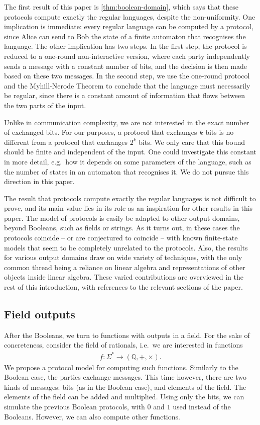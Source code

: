 The first result of this paper is \cref{thm:boolean-domain}, which says that these protocols compute exactly the regular languages, despite the non-uniformity. One implication is immediate: every regular language can be computed by a protocol, since Alice can send to Bob the state of a finite automaton that recognises the language. The other implication has two steps. In the first step, the protocol is reduced to a one-round non-interactive version, where each party independently sends a message with a constant number of bits, and the decision is then made based on these two messages. In the second step, we use the one-round protocol and the Myhill-Nerode Theorem to conclude that the language must necessarily be regular, since there is a constant amount of information that flows between the two parts of the input. 

Unlike in communication complexity, we are not interested in the exact number of exchanged bits. For our purposes, a protocol that exchanges $k$ bits is no different from a protocol that exchanges $2^k$ bits. We only care that this bound should be finite and independent of the input. One could investigate this constant in more detail, e.g.~how it depends on some parameters of the language, such as the number of states in an automaton that recognises it. We do not pursue this direction in this paper.


The result that protocols compute exactly the regular languages is not difficult to prove, and its main value lies in its role as an inspiration for other results in this paper. The model of protocols is easily be adapted to other output domains, beyond Booleans, such as  fields or strings. 
As it turns out, in these cases  the protocols coincide -- or are conjectured to coincide -- with known finite-state models that seem to be completely unrelated to the protocols. Also, the results for various output domains draw on wide variety of techniques, with the only common thread being a reliance on linear algebra and representations of other objects inside linear algebra. These varied contributions are overviewed in the rest of this introduction, with references to the relevant sections of the paper.

\subsection{Field outputs}
\label{sec:intro-field}



After the Booleans, we turn to functions with outputs in a field. For the sake of concreteness, consider the field of rationals, i.e.~we are interested in functions
\begin{align*}
f : \Sigma^* \to (\mathbb Q, +, \times).
\end{align*}
We propose a protocol model for computing such functions. Similarly to the Boolean case, the parties exchange messages. This time however, there are two kinds of messages: bits (as in the Boolean case), and  elements of the field.  The elements of the field can be added and multiplied.   Using only the bits, we can simulate the previous Boolean protocols, with $0$ and $1$ used instead of the Booleans. However, we can also compute other functions.

